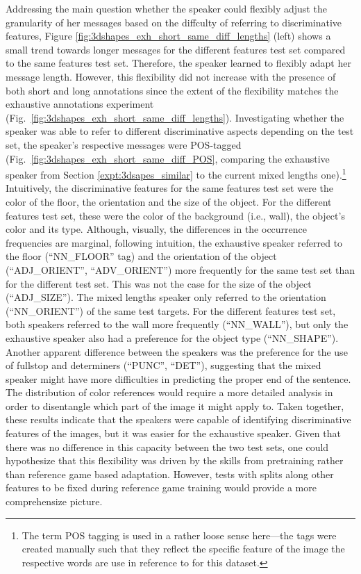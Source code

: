 Addressing the main question whether the speaker could flexibly adjust the granularity of her messages based on the diffculty of referring to discriminative features, Figure \ref{fig:3dshapes_exh_short_same_diff_lengths} (left) shows a small trend towards longer messages for the different features test set compared to the same features test set. Therefore, the speaker learned to flexibly adapt her message length. However, this flexibility did not increase with the presence of both short and long annotations since the extent of the flexibility matches the exhaustive annotations experiment (Fig.~\ref{fig:3dshapes_exh_short_same_diff_lengths}). 
Investigating whether the speaker was able to refer to different discriminative aspects depending on the test set, the speaker's respective messages were POS-tagged (Fig.~\ref{fig:3dshapes_exh_short_same_diff_POS}, comparing the exhaustive speaker from Section \ref{expt:3dsapes_similar} to the current mixed lengths one).\footnote{The term POS tagging is used in a rather loose sense here---the tags were created manually such that they reflect the specific feature of the image the respective words are use in reference to for this dataset.} Intuitively, the discriminative features for the same features test set were the color of the floor, the orientation and the size of the object. For the different features test set, these were the color of the background (i.e., wall), the object's color and its type. Although, visually, the differences in the occurrence frequencies are marginal, following intuition, the exhaustive speaker referred to the floor (``NN\_FLOOR'' tag) and the orientation of the object (``ADJ\_ORIENT'', ``ADV\_ORIENT'') more frequently for the same test set than for the different test set. This was not the case for the size of the object (``ADJ\_SIZE''). The mixed lengths speaker only referred to the orientation (``NN\_ORIENT'') of the same test targets. For the different features test set, both speakers referred to the wall more frequently (``NN\_WALL''), but only the exhaustive speaker also had a preference for the object type (``NN\_SHAPE''). Another apparent difference between the speakers was the preference for the use of fullstop and determiners (``PUNC'', ``DET''), suggesting that the mixed speaker might have more difficulties in predicting the proper end of the sentence.
The distribution of color references would require a more detailed analysis in order to disentangle which part of the image it might apply to. Taken together, these results indicate that the speakers were capable of identifying discriminative features of the images, but it was easier for the exhaustive speaker. Given that there was no difference in this capacity between the two test sets, one could hypothesize that this flexibility was driven by the skills from pretraining rather than reference game based adaptation. However, tests with splits along other features to be fixed during reference game training would provide a more comprehensize picture.

